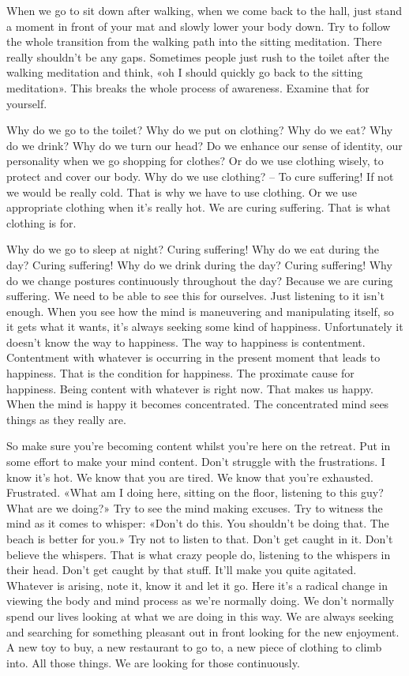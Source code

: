 \documentclass[letterpaper,10pt,english]{sphinxmanual}
\begin{document}
\sphinxAtStartPar
When we go to sit down after walking, when we come back to the hall,
just stand a moment in front of your mat and slowly lower your body down.
Try  to  follow  the  whole  transition  from  the  walking  path  into  the  sitting
meditation. There really shouldn’t be any gaps. Sometimes people just rush
to the toilet after the walking meditation and think, «oh I should quickly go
back to the sitting meditation». This breaks the whole process of awareness.
Examine that for yourself.

\sphinxAtStartPar
Why do we go to the toilet? Why do we put on clothing? Why do we
eat? Why do we drink? Why do we turn our head? Do we enhance our sense
of identity, our personality when we go shopping for clothes? Or do we use
clothing wisely, to protect and cover our body. Why do we use clothing? – To
cure suffering! If not we would be really cold. That is why we have to use
clothing. Or we use appropriate clothing when it’s really hot. We are curing
suffering. That is what clothing is for.

\sphinxAtStartPar
Why  do  we  go  to  sleep  at  night?  Curing  suffering!  Why  do  we  eat
during the day? Curing suffering! Why do we drink during the day? Curing
suffering!  Why  do  we  change  postures  continuously  throughout  the  day?
Because we are curing suffering. We need to be able to see this for ourselves.
Just listening to it isn’t enough. When you see how the mind is maneuvering
and  manipulating  itself,  so  it  gets  what  it  wants,  it’s  always  seeking  some
kind of happiness. Unfortunately it doesn’t know the way to happiness. The
  way to happiness is contentment. Contentment with whatever is occurring
in the present moment that leads to happiness. That is the condition for happiness. The proximate cause for happiness. Being content with whatever is
right now. That makes us happy. When the mind is happy it becomes concentrated. The concentrated mind sees things as they really are.

\sphinxAtStartPar
So make sure you’re becoming content whilst you’re here on the retreat.
Put in some effort to make your mind content. Don’t struggle with the frustrations. I know it’s hot. We know that you are tired. We know that you’re
exhausted. Frustrated. «What am I doing here, sitting on the floor, listening
to this guy? What are we doing?» Try to see the mind making excuses. Try
to witness the mind as it comes to whisper: «Don’t do this. You shouldn’t be
doing that. The beach is better for you.» Try not to listen to that. Don’t get
caught in it. Don’t believe the whispers. That is what crazy people do, listening to the whispers in their head. Don’t get caught by that stuff. It’ll make
you quite agitated. Whatever is arising, note it, know it and let it go. Here
it’s a radical change in viewing the body and mind process as we’re normally
doing. We don’t normally spend our lives looking at what we are doing in
this way. We are always seeking and searching for something pleasant out in
front looking for the new enjoyment. A new toy to buy, a new restaurant to
go to, a new piece of clothing to climb into. All those things. We are looking
for those continuously.
\end{document}
